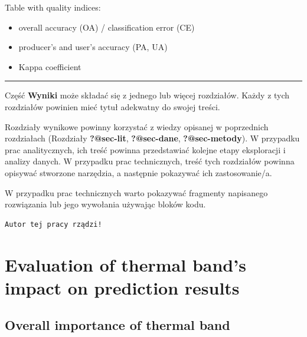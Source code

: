 \documentclass{amuthesis}
\begin{document}
Table with quality indices:

\begin{itemize}
\item
  overall accuracy (OA) / classification error (CE)
\item
  producer's and user's accuracy (PA, UA)
\item
  Kappa coefficient
\end{itemize}

\begin{center}\rule{0.5\linewidth}{0.5pt}\end{center}

Część \textbf{Wyniki} może składać się z jednego lub więcej rozdziałów.
Każdy z tych rozdziałów powinien mieć tytuł adekwatny do swojej treści.

Rozdziały wynikowe powinny korzystać z wiedzy opisanej w poprzednich
rozdziałach (Rozdziały \textbf{?@sec-lit}, \textbf{?@sec-dane},
\textbf{?@sec-metody}). W przypadku prac analitycznych, ich treść
powinna przedstawiać kolejne etapy eksploracji i analizy danych. W
przypadku prac technicznych, treść tych rozdziałów powinna opisywać
stworzone narzędzia, a następnie pokazywać ich zastosowanie/a.

W przypadku prac technicznych warto pokazywać fragmenty napisanego
rozwiązania lub jego wywołania używając bloków kodu.

\begin{Shaded}
\begin{Highlighting}[]
\OtherTok{=} 
  \NormalTok{)}
\NormalTok{\}}
\NormalTok{(}\NormalTok{)}
\end{Highlighting}
\end{Shaded}

\begin{verbatim}
Autor tej pracy rządzi!
\end{verbatim}


\hypertarget{sec-results-therm}{%
\chapter{Evaluation of thermal band's impact on prediction
results}\label{sec-results-therm}}

\hypertarget{sec-imp-overall}{%
\section{Overall importance of thermal band}\label{sec-imp-overall}}
\end{document}
